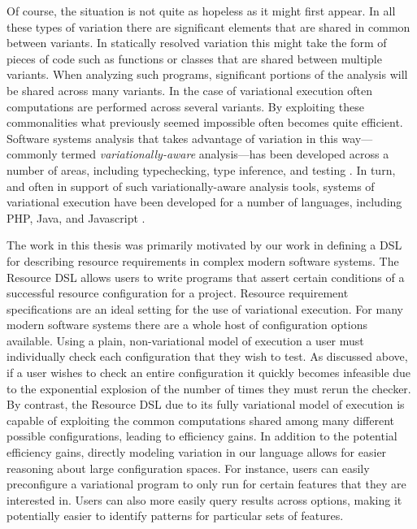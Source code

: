 \documentclass[12pt,oneside]{book}
\begin{document}
Of course, the situation is not quite as hopeless as it might first appear. In all these types of variation
there are significant elements that are shared in common between variants. In statically resolved variation this might take the form of pieces of code such as functions
or classes that are shared between multiple variants. When analyzing such programs, significant portions of the analysis will be shared across many variants. In the case of variational execution often computations are performed across several variants.
By exploiting these commonalities what previously seemed impossible often becomes quite efficient. Software systems analysis that takes advantage of variation
in this way---commonly termed \emph{variationally-aware} analysis---has been developed across a number of areas, including typechecking, type inference, and
testing \cite{kenner2010typechef,chen2014extending,thum2014classification}. In turn, and often in support of such variationally-aware analysis tools, systems of variational execution have been developed for a number
of languages, including PHP, Java, and Javascript \cite{varex,varexj,facted}.

The work in this thesis was primarily motivated by our work in defining a DSL for describing resource requirements in complex modern software
systems. The Resource DSL allows users to write programs that assert certain conditions of a successful resource configuration for a project.
Resource requirement specifications are an ideal setting for the use of variational execution. For many modern software systems there are a
whole host of configuration options available. Using a plain, non-variational model of execution a user must individually check each configuration that they wish to
test. As discussed above, if a user wishes to check an entire configuration it quickly becomes infeasible due to the exponential explosion of the number of times they must
rerun the checker. By contrast, the Resource DSL due to its fully variational model of execution is capable of exploiting the common computations shared among many different
possible configurations, leading to efficiency gains. In addition to the potential efficiency gains, directly modeling variation in our language allows for easier reasoning about
large configuration spaces. For instance, users can easily preconfigure a variational program to only run for certain features that they are interested in. Users can also more easily
query results across options, making it potentially easier to identify patterns for particular sets of features.
\end{document}
